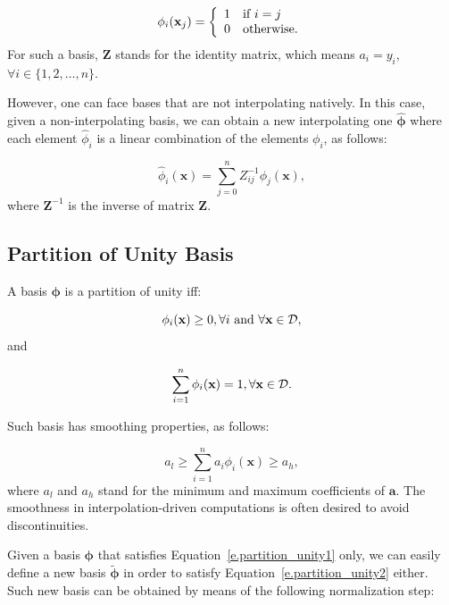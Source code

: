 \begin{equation}
\label{eq.condInterpolating}
\phi_i(\textbf{x}_j) =  \left\{
			  \begin{array}{ll}
			      1 & \hbox{if $i = j$}\\
			      0 & \hbox{otherwise.}\\
			  \end{array}
		    \right.		    
\end{equation}
For such a basis, $\mathbf{Z}$ stands for the identity matrix, which means $a_i=y_i$, $\forall i\in\{1,2,\ldots,n\}$.

However, one can face bases that are not interpolating natively. In this case, given a non-interpolating basis, we can obtain a new interpolating one $\mathbf{\hat{\phi}}$ where each element $\hat{\phi}_i$ is a linear combination of the elements $\phi_i$, as follows:

\begin{equation}
\label{e.interpolating_basis}
	\hat{\phi}_i(\textbf{x})=\sum_{j=0}^nZ_{ij}^{-1}\phi_j(\textbf{x}),
\end{equation}
where $\mathbf{Z}^{-1}$ is the inverse of matrix $\mathbf{Z}$.

\subsection{Partition of Unity Basis}
\label{ss.partition}

A basis $\mathbf{\phi}$ is a partition of unity iff:

\begin{equation}
\label{e.partition_unity1}
	\phi_i(\textbf{x})\geq 0, \forall i\text{ and }\forall \textbf{x}\in{\cal D},
\end{equation}
and

\begin{equation}
\label{e.partition_unity2}
\sum_{i=1}^n\phi_i(\textbf{x})=1,\forall \textbf{x}\in{\cal D}.	
\end{equation}

Such basis has smoothing properties, as follows:

\begin{equation}
	a_l\geq \sum_{i=1}^na_i\phi_i(\textbf{x})\geq a_h,
\end{equation}
where $a_l$ and $a_h$ stand for the minimum and maximum coefficients of $\mathbf{a}$. The smoothness in interpolation-driven computations is often desired to avoid discontinuities.

Given a basis $\mathbf{\phi}$ that satisfies Equation~\ref{e.partition_unity1} only, we can easily define a new basis $\mathbf{\tilde{\phi}}$ in order to satisfy Equation~\ref{e.partition_unity2} either. Such new basis can be obtained by means of the following normalization step:


